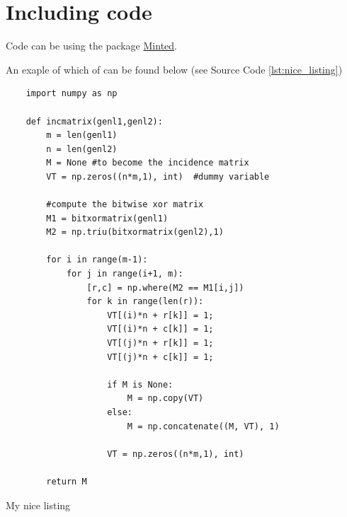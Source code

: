 \section{Including code}

Code can be using the package
\href{https://www.sharelatex.com/learn/Code\_Highlighting\_with\_minted}{Minted}.

An exaple of which of can be found below (see Source Code \ref{lst:nice_listing})
\begin{listing}
	\begin{verbatim} 
	import numpy as np
	
	def incmatrix(genl1,genl2):
	    m = len(genl1)
	    n = len(genl2)
	    M = None #to become the incidence matrix
	    VT = np.zeros((n*m,1), int)  #dummy variable
	
	    #compute the bitwise xor matrix
	    M1 = bitxormatrix(genl1)
	    M2 = np.triu(bitxormatrix(genl2),1)
	
	    for i in range(m-1):
	        for j in range(i+1, m):
	            [r,c] = np.where(M2 == M1[i,j])
	            for k in range(len(r)):
	                VT[(i)*n + r[k]] = 1;
	                VT[(i)*n + c[k]] = 1;
	                VT[(j)*n + r[k]] = 1;
	                VT[(j)*n + c[k]] = 1;
	
	                if M is None:
	                    M = np.copy(VT)
	                else:
	                    M = np.concatenate((M, VT), 1)
	
	                VT = np.zeros((n*m,1), int)
	
	    return M
	\end{verbatim}

  \caption{My nice listing}
  \label{lst:nice_listing}
\end{listing}
